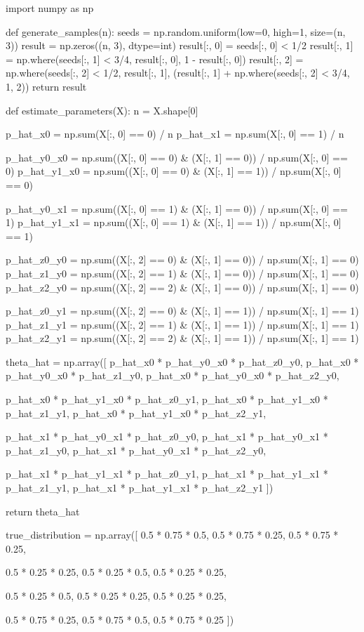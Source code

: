 \begin{python}
import numpy as np

def generate_samples(n):
    seeds = np.random.uniform(low=0, high=1, size=(n, 3))
    result = np.zeros((n, 3), dtype=int)
    result[:, 0] = seeds[:, 0] < 1/2
    result[:, 1] = np.where(seeds[:, 1] < 3/4, result[:, 0], 1 - result[:, 0])
    result[:, 2] = np.where(seeds[:, 2] < 1/2, result[:, 1], (result[:, 1] + np.where(seeds[:, 2] < 3/4, 1, 2)) %
    return result

def estimate_parameters(X):
    n = X.shape[0]
    
    p_hat_x0 = np.sum(X[:, 0] == 0) / n
    p_hat_x1 = np.sum(X[:, 0] == 1) / n
    
    p_hat_y0_x0 = np.sum((X[:, 0] == 0) & (X[:, 1] == 0)) / np.sum(X[:, 0] == 0)
    p_hat_y1_x0 = np.sum((X[:, 0] == 0) & (X[:, 1] == 1)) / np.sum(X[:, 0] == 0)
    
    p_hat_y0_x1 = np.sum((X[:, 0] == 1) & (X[:, 1] == 0)) / np.sum(X[:, 0] == 1)
    p_hat_y1_x1 = np.sum((X[:, 0] == 1) & (X[:, 1] == 1)) / np.sum(X[:, 0] == 1)
    
    p_hat_z0_y0 = np.sum((X[:, 2] == 0) & (X[:, 1] == 0)) / np.sum(X[:, 1] == 0)
    p_hat_z1_y0 = np.sum((X[:, 2] == 1) & (X[:, 1] == 0)) / np.sum(X[:, 1] == 0)
    p_hat_z2_y0 = np.sum((X[:, 2] == 2) & (X[:, 1] == 0)) / np.sum(X[:, 1] == 0)

    p_hat_z0_y1 = np.sum((X[:, 2] == 0) & (X[:, 1] == 1)) / np.sum(X[:, 1] == 1)
    p_hat_z1_y1 = np.sum((X[:, 2] == 1) & (X[:, 1] == 1)) / np.sum(X[:, 1] == 1)
    p_hat_z2_y1 = np.sum((X[:, 2] == 2) & (X[:, 1] == 1)) / np.sum(X[:, 1] == 1)
    
    theta_hat = np.array([
        p_hat_x0 * p_hat_y0_x0 * p_hat_z0_y0,
        p_hat_x0 * p_hat_y0_x0 * p_hat_z1_y0,
        p_hat_x0 * p_hat_y0_x0 * p_hat_z2_y0,
        
        p_hat_x0 * p_hat_y1_x0 * p_hat_z0_y1,
        p_hat_x0 * p_hat_y1_x0 * p_hat_z1_y1,
        p_hat_x0 * p_hat_y1_x0 * p_hat_z2_y1,
        
        p_hat_x1 * p_hat_y0_x1 * p_hat_z0_y0,
        p_hat_x1 * p_hat_y0_x1 * p_hat_z1_y0,
        p_hat_x1 * p_hat_y0_x1 * p_hat_z2_y0,
        
        p_hat_x1 * p_hat_y1_x1 * p_hat_z0_y1,
        p_hat_x1 * p_hat_y1_x1 * p_hat_z1_y1,
        p_hat_x1 * p_hat_y1_x1 * p_hat_z2_y1
    ])
    
    return theta_hat

true_distribution = np.array([
    0.5 * 0.75 * 0.5,
    0.5 * 0.75 * 0.25,
    0.5 * 0.75 * 0.25,

    0.5 * 0.25 * 0.25,
    0.5 * 0.25 * 0.5,
    0.5 * 0.25 * 0.25,

    0.5 * 0.25 * 0.5,
    0.5 * 0.25 * 0.25,
    0.5 * 0.25 * 0.25,

    0.5 * 0.75 * 0.25,
    0.5 * 0.75 * 0.5,
    0.5 * 0.75 * 0.25
])
\end{python}

